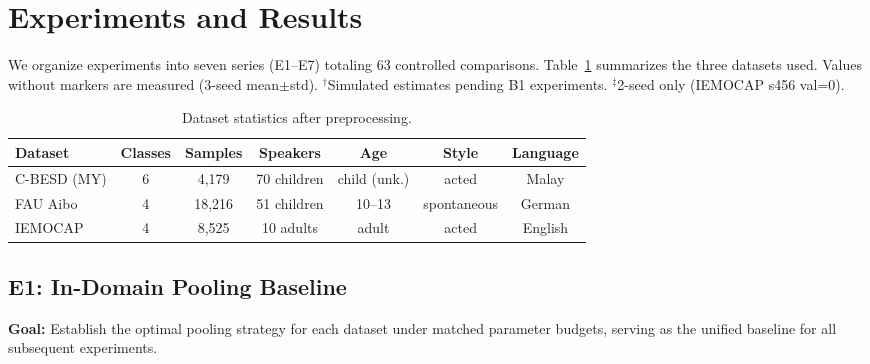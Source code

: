 
\section{Experiments and Results}
\label{sec:experiments_results}

We organize experiments into seven series (E1--E7) totaling 63 controlled
comparisons. Table~\ref{tab:datasets} summarizes the three datasets used.
Values without markers are measured (3-seed mean$\pm$std). $^\dagger$Simulated
estimates pending B1 experiments. $^\ddagger$2-seed only (IEMOCAP s456 val=0).

\begin{table}[t]
\centering
\caption{Dataset statistics after preprocessing.}
\label{tab:datasets}
\begin{tabular}{lcccccc}
\toprule
\textbf{Dataset} & \textbf{Classes} & \textbf{Samples} & \textbf{Speakers} & \textbf{Age} & \textbf{Style} & \textbf{Language} \\
\midrule
C-BESD (MY) & 6 & 4,179 & 70 children & child (unk.) & acted & Malay \\
FAU Aibo    & 4 & 18,216 & 51 children & 10--13 & spontaneous & German \\
IEMOCAP     & 4 & 8,525 & 10 adults & adult & acted & English \\
\bottomrule
\end{tabular}
\end{table}

\subsection{E1: In-Domain Pooling Baseline}
\label{ssec:e1}

\textbf{Goal:} Establish the optimal pooling strategy for each dataset under
matched parameter budgets, serving as the unified baseline for all subsequent
experiments.

